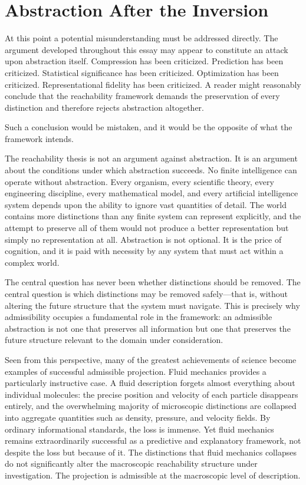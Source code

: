 \documentclass[12pt,a4paper]{article}
\theoremstyle{plain}
\theoremstyle{definition}
\theoremstyle{remark}
\begin{document}
\section{Abstraction After the Inversion}

At this point a potential misunderstanding must be addressed directly. The
argument developed throughout this essay may appear to constitute an attack
upon abstraction itself. Compression has been criticized. Prediction has been
criticized. Statistical significance has been criticized. Optimization has
been criticized. Representational fidelity has been criticized. A reader
might reasonably conclude that the reachability framework demands the
preservation of every distinction and therefore rejects abstraction
altogether.

Such a conclusion would be mistaken, and it would be the opposite of what
the framework intends.

The reachability thesis is not an argument against abstraction. It is an
argument about the conditions under which abstraction succeeds. No finite
intelligence can operate without abstraction. Every organism, every
scientific theory, every engineering discipline, every mathematical model,
and every artificial intelligence system depends upon the ability to ignore
vast quantities of detail. The world contains more distinctions than any
finite system can represent explicitly, and the attempt to preserve all of
them would not produce a better representation but simply no representation
at all. Abstraction is not optional. It is the price of cognition, and it
is paid with necessity by any system that must act within a complex world.

The central question has never been whether distinctions should be removed.
The central question is which distinctions may be removed safely---that is,
without altering the future structure that the system must navigate. This
is precisely why admissibility occupies a fundamental role in the framework:
an admissible abstraction is not one that preserves all information but one
that preserves the future structure relevant to the domain under
consideration.

Seen from this perspective, many of the greatest achievements of science
become examples of successful admissible projection. Fluid mechanics provides
a particularly instructive case. A fluid description forgets almost
everything about individual molecules: the precise position and velocity of
each particle disappears entirely, and the overwhelming majority of
microscopic distinctions are collapsed into aggregate quantities such as
density, pressure, and velocity fields. By ordinary informational standards,
the loss is immense. Yet fluid mechanics remains extraordinarily successful
as a predictive and explanatory framework, not despite the loss but because
of it. The distinctions that fluid mechanics collapses do not significantly
alter the macroscopic reachability structure under investigation. The
projection is admissible at the macroscopic level of description.
\end{document}
